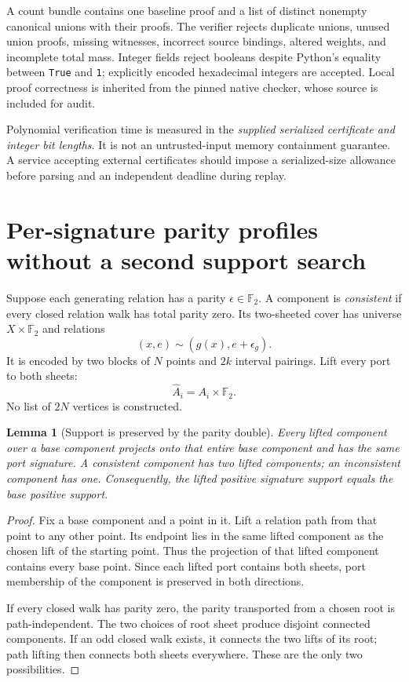 \documentclass[11pt,letterpaper]{article}
\newtheorem{lemma}[theorem]{Lemma}
\theoremstyle{definition}\newtheorem{definition}[theorem]{Definition}
\theoremstyle{remark}\newtheorem{remark}[theorem]{Remark}
\newcommand{\F}{\mathbb{F}}
\newcommand{\api}[1]{\texttt{#1}}
\begin{document}
A count bundle contains one baseline proof and a list of distinct nonempty canonical unions with their proofs. The verifier rejects duplicate unions, unused union proofs, missing witnesses, incorrect source bindings, altered weights, and incomplete total mass. Integer fields reject booleans despite Python's equality between \api{True} and \api{1}; explicitly encoded hexadecimal integers are accepted. Local proof correctness is inherited from the pinned native checker, whose source is included for audit.

Polynomial verification time is measured in the \emph{supplied serialized certificate and integer bit lengths}. It is not an untrusted-input memory containment guarantee. A service accepting external certificates should impose a serialized-size allowance before parsing and an independent deadline during replay.

\section{Per-signature parity profiles without a second support search}
\label{sec:parity}

Suppose each generating relation has a parity $\epsilon\in\F_2$. A component is \emph{consistent} if every closed relation walk has total parity zero. Its two-sheeted cover has universe $X\times\F_2$ and relations
\[
(x,e)\sim(g(x),e+\epsilon_g).
\]
It is encoded by two blocks of $N$ points and $2k$ interval pairings. Lift every port to both sheets:
\[
\widehat A_i=A_i\times\F_2.
\]
No list of $2N$ vertices is constructed.

\begin{lemma}[Support is preserved by the parity double]
\label{lem:liftsupport}
Every lifted component over a base component projects onto that entire base component and has the same port signature. A consistent component has two lifted components; an inconsistent component has one. Consequently, the lifted positive signature support equals the base positive support.
\end{lemma}
\begin{proof}
Fix a base component and a point in it. Lift a relation path from that point to any other point. Its endpoint lies in the same lifted component as the chosen lift of the starting point. Thus the projection of that lifted component contains every base point. Since each lifted port contains both sheets, port membership of the component is preserved in both directions.

If every closed walk has parity zero, the parity transported from a chosen root is path-independent. The two choices of root sheet produce disjoint connected components. If an odd closed walk exists, it connects the two lifts of its root; path lifting then connects both sheets everywhere. These are the only two possibilities.
\end{proof}
\end{document}
